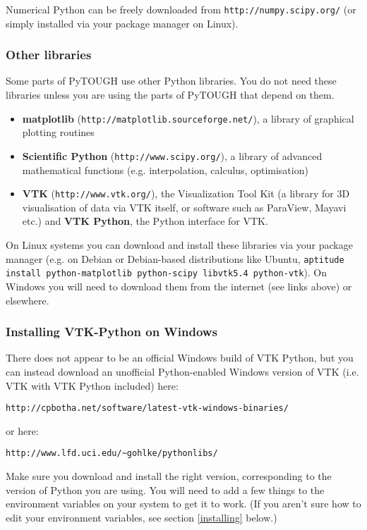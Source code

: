 Numerical Python can be freely downloaded from \texttt{http://numpy.scipy.org/} (or simply installed via your package manager on Linux).

\subsubsection{Other libraries}

Some parts of PyTOUGH use other Python libraries.  You do not need these libraries unless you are using the parts of PyTOUGH that depend on them.

\begin{itemize}
\item \textbf{matplotlib} (\texttt{http://matplotlib.sourceforge.net/}), a library of graphical plotting routines
\item \textbf{Scientific Python} (\texttt{http://www.scipy.org/}), a library of advanced mathematical functions (e.g. interpolation, calculus, optimisation)
\item \textbf{VTK} (\texttt{http://www.vtk.org/}), the Visualization Tool Kit (a library for 3D visualisation of data via VTK itself, or software such as ParaView, Mayavi etc.) and \textbf{VTK Python}, the Python interface for VTK.
\end{itemize}

On Linux systems you can download and install these libraries via your package manager (e.g. on Debian or Debian-based distributions like Ubuntu, \texttt{aptitude install python-matplotlib python-scipy libvtk5.4 python-vtk}).  On Windows you will need to download them from the internet (see links above) or elsewhere.

\subsubsection{Installing VTK-Python on Windows}

There does not appear to be an official Windows build of VTK Python, but you can instead download an unofficial Python-enabled Windows version of VTK (i.e. VTK with VTK Python included) here:

\texttt{http://cpbotha.net/software/latest-vtk-windows-binaries/}

or here:

\texttt{http://www.lfd.uci.edu/\textasciitilde gohlke/pythonlibs/}

Make sure you download and install the right version, corresponding to the version of Python you are using.  You will need to add a few things to the environment variables on your system to get it to work.  (If you aren't sure how to edit your environment variables, see section \ref{installing} below.) 

